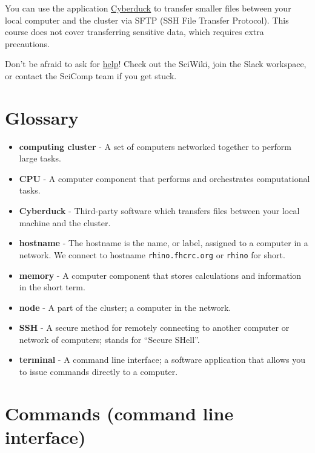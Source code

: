\documentclass[
]{book}
\providecommand{\tightlist}{%
  \setlength{\itemsep}{0pt}\setlength{\parskip}{0pt}}
\begin{document}
You can use the application \protect\hyperlink{file-upload-and-download}{Cyberduck} to transfer smaller files between your local computer and the cluster via SFTP (SSH File Transfer Protocol). This course does not cover transferring sensitive data, which requires extra precautions.

Don't be afraid to ask for \protect\hyperlink{help}{help}! Check out the SciWiki, join the Slack workspace, or contact the SciComp team if you get stuck.

\hypertarget{glossary}{%
\section{Glossary}\label{glossary}}

\begin{itemize}
\tightlist
\item
  \textbf{computing cluster} - A set of computers networked together to perform large tasks.
\item
  \textbf{CPU} - A computer component that performs and orchestrates computational tasks.
\item
  \textbf{Cyberduck} - Third-party software which transfers files between your local machine and the cluster.
\item
  \textbf{hostname} - The hostname is the name, or label, assigned to a computer in a network. We connect to hostname \texttt{rhino.fhcrc.org} or \texttt{rhino} for short.
\item
  \textbf{memory} - A computer component that stores calculations and information in the short term.
\item
  \textbf{node} - A part of the cluster; a computer in the network.
\item
  \textbf{SSH} - A secure method for remotely connecting to another computer or network of computers; stands for ``Secure SHell''.
\item
  \textbf{terminal} - A command line interface; a software application that allows you to issue commands directly to a computer.
\end{itemize}

\hypertarget{commands-command-line-interface}{%
\section{Commands (command line interface)}\label{commands-command-line-interface}}
\end{document}
